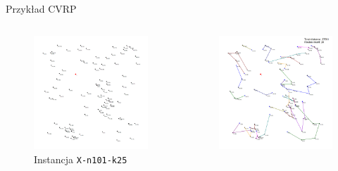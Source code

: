 \documentclass{beamer}
\begin{document}
\begin{frame}{Przykład CVRP}
    \begin{columns}
        \begin{column}{0.55\textwidth}
            \begin{figure}
                \centering
                \includegraphics[width=\linewidth]{../report/img/20250405_224145_X-n101-k25.png}
                \caption{Instancja \texttt{X-n101-k25}}
            \end{figure}        
        \end{column}
        \begin{column}{0.55\textwidth}
            \begin{figure}
                \centering
                \includegraphics[width=\linewidth]{../report/img/20250407_002013_X-n101-k25_optimal.png}

\end{figure}
\end{column}
\end{columns}
\end{frame}
\end{document}
